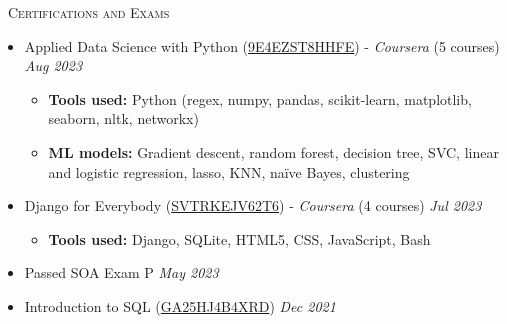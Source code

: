 \documentclass[a4paper,11pt]{article}
\newcommand{\header} [1] {
    \vspace{1mm}
    {\textsc{\large{\xrfill[0.5ex]{0.5pt}~#1~\xrfill[0.5ex]{0.5pt}}}} %
}
\begin{document}
\header{Certifications and Exams} \\
\vspace{1mm}
\begin{itemize}
    \item Applied Data Science with Python (\href{https://www.coursera.org/account/accomplishments/specialization/9E4EZST8HHFE}{9E4EZST8HHFE}) - \emph{Coursera} (5 courses) \hfill \emph{Aug 2023}
    \begin{itemize}
        \item \textbf{Tools used:} Python (regex, numpy, pandas, scikit-learn, matplotlib, seaborn, nltk, networkx)
        \item \textbf{ML models:} Gradient descent, random forest, decision tree, SVC, linear and logistic regression, lasso, KNN, na\"{i}ve Bayes, clustering
    \end{itemize}
    \item Django for Everybody (\href{https://www.coursera.org/account/accomplishments/specialization/SVTRKEJV62T6}{SVTRKEJV62T6}) - \emph{Coursera} (4 courses) \hfill \emph{Jul 2023}
    \begin{itemize}
        \item \textbf{Tools used:} Django, SQLite, HTML5, CSS, JavaScript, Bash
    \end{itemize}
    \item Passed SOA Exam P \hfill \emph{May 2023}
    \item Introduction to SQL (\href{https://www.coursera.org/account/accomplishments/verify/GA25HJ4B4XRD}{GA25HJ4B4XRD}) \hfill  \emph{Dec 2021}
\end{itemize}
\vspace{1mm}


\end{document}
